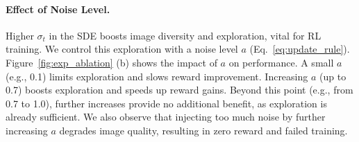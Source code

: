 \paragraph{Effect of Noise Level.}\label{sec:exp:noise_scheduler}
Higher $\sigma_t$ in the SDE boosts image diversity and exploration, vital for RL training. We control this exploration with a noise level $a$ (Eq.~\ref{eq:update_rule}).
Figure~\ref{fig:exp_ablation} (b) shows the impact of $a$ on performance. A small $a$ (e.g., 0.1) limits exploration and slows reward improvement. Increasing $a$ (up to 0.7) boosts exploration and speeds up reward gains. Beyond this point (e.g., from 0.7 to 1.0), further increases provide no additional benefit, as exploration is already sufficient. We also observe that injecting too much noise by further increasing $a$ degrades image quality, resulting in zero reward and failed training. 

